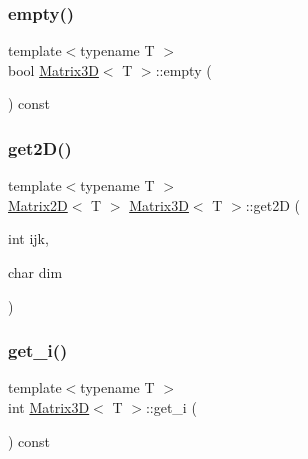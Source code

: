 \mbox{\label{classMatrix3D_a6f1e6328bac16786a4bfad6f107db641_a6f1e6328bac16786a4bfad6f107db641}} 
\subsubsection{\texorpdfstring{empty()}{empty()}}
{\footnotesize\ttfamily template$<$typename T $>$ \\
bool \mbox{\hyperlink{classMatrix3D}{Matrix3D}}$<$ T $>$\+::empty (\begin{DoxyParamCaption}{ }\end{DoxyParamCaption}) const}

\mbox{\label{classMatrix3D_ac5c77248be46bfef323f0229f6e0a59c_ac5c77248be46bfef323f0229f6e0a59c}} 
\subsubsection{\texorpdfstring{get2\+D()}{get2D()}}
{\footnotesize\ttfamily template$<$typename T $>$ \\
\mbox{\hyperlink{classMatrix2D}{Matrix2D}}$<$ T $>$ \mbox{\hyperlink{classMatrix3D}{Matrix3D}}$<$ T $>$\+::get2D (\begin{DoxyParamCaption}\item[{int}]{ijk,  }\item[{char}]{dim }\end{DoxyParamCaption})}

\mbox{\label{classMatrix3D_af02576e685de872ba1b75014d9a609c9_af02576e685de872ba1b75014d9a609c9}} 
\subsubsection{\texorpdfstring{get\+\_\+i()}{get\_i()}}
{\footnotesize\ttfamily template$<$typename T $>$ \\
int \mbox{\hyperlink{classMatrix3D}{Matrix3D}}$<$ T $>$\+::get\+\_\+i (\begin{DoxyParamCaption}{ }\end{DoxyParamCaption}) const}

